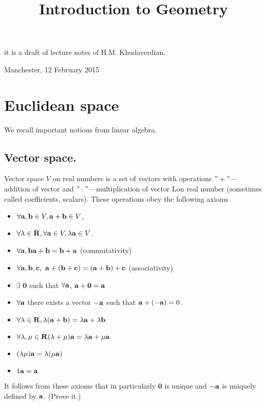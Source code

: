 \documentclass[12pt]{article}
\title{Introduction to  Geometry}
\date{}
\numberwithin{equation}{section}
\begin{document}
\maketitle

  \centerline {it is a draft of lecture notes of H.M. Khudaverdian.}

  \centerline { Manchester, 12 February  2015}

\tableofcontents
{}

\newpage
\section {Euclidean space}

We recall important notions from linear algebra.


\subsection {Vector space.}


Vector space $V$ on real numbers is a set of vectors with operations
$"+"$---addition of vector and $"\cdot"$---multiplication of vector
Lon real number (sometimes called coefficients, scalars). These
operations obey the following axioms


\begin{itemize}
 \item  $\forall {\bf a},{\bf b}\in V, {\bf a}+{\bf b}\in V$,

 \item $\forall \lambda\in {\bf R}, \forall {\bf a}\in V, \lambda {\bf a}\in V$.

\item
  $\forall {\bf a},{\bf b} {\bf a}+{\bf b}={\bf b}+{\bf a}$  (commutativity)
\item
$\forall {\bf a},{\bf b},{\bf c}, \,\,{\bf a}+({\bf b}+{\bf c})=({\bf a}+{\bf b})+{\bf c}$ (associativity)

\item  $\exists\,\, {\mathbf 0}$ such that $\forall {\bf a}$,
 ${\bf a}+{\mathbf 0}={\bf a}$

\item  $\forall {\bf a}$ there exists a vector $-{\bf a}$ such that ${\bf a}+(-{\bf a})=0$.

\item

  $\forall\lambda\in {\bf R}, \lambda({\bf a}+{\bf b})=\lambda {\bf a}+\lambda {\bf b}$

  \item

    $\forall\lambda,\mu\in {\bf R} (\lambda+\mu){\bf a}=\lambda{\bf a}+\mu{\bf a}$

    \item $(\lambda\mu){\bf a}=\lambda(\mu{\bf a})$

    \item $1{\bf a}={\bf a}$

\end{itemize}
It follows from these axioms  that in particularly $\mathbf 0$ is unique and $-{\bf a}$ is uniquely defined
by ${\bf a}$. (Prove it.)
\end{document}
